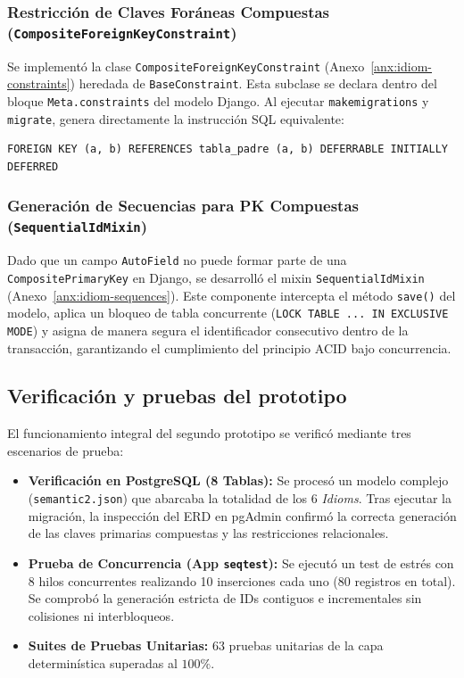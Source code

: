 \subsubsection{Restricción de Claves Foráneas Compuestas (\texttt{CompositeForeignKeyConstraint})}
Se implementó la clase \texttt{CompositeForeignKeyConstraint} (Anexo~\ref{anx:idiom-constraints}) heredada de \texttt{BaseConstraint}. Esta subclase se declara dentro del bloque \texttt{Meta.constraints} del modelo Django. Al ejecutar \texttt{makemigrations} y \texttt{migrate}, genera directamente la instrucción SQL equivalente:
\begin{verbatim}
FOREIGN KEY (a, b) REFERENCES tabla_padre (a, b) DEFERRABLE INITIALLY DEFERRED
\end{verbatim}

\subsubsection{Generación de Secuencias para PK Compuestas (\texttt{SequentialIdMixin})}
Dado que un campo \texttt{AutoField} no puede formar parte de una \texttt{CompositePrimaryKey} en Django, se desarrolló el mixin \texttt{SequentialIdMixin} (Anexo~\ref{anx:idiom-sequences}). Este componente intercepta el método \texttt{save()} del modelo, aplica un bloqueo de tabla concurrente (\texttt{LOCK TABLE ... IN EXCLUSIVE MODE}) y asigna de manera segura el identificador consecutivo dentro de la transacción, garantizando el cumplimiento del principio ACID bajo concurrencia.

\subsection{Verificación y pruebas del prototipo}
\label{subsec:p2-verificacion}

El funcionamiento integral del segundo prototipo se verificó mediante tres escenarios de prueba:

\begin{itemize}
    \item \textbf{Verificación en PostgreSQL (8 Tablas):} Se procesó un modelo complejo (\texttt{semantic2.json}) que abarcaba la totalidad de los 6 \textit{Idioms}. Tras ejecutar la migración, la inspección del ERD en pgAdmin confirmó la correcta generación de las claves primarias compuestas y las restricciones relacionales.
    \item \textbf{Prueba de Concurrencia (App \texttt{seqtest}):} Se ejecutó un test de estrés con 8 hilos concurrentes realizando 10 inserciones cada uno (80 registros en total). Se comprobó la generación estricta de IDs contiguos e incrementales sin colisiones ni interbloqueos.
    \item \textbf{Suites de Pruebas Unitarias:} 63 pruebas unitarias de la capa determinística superadas al $100\%$.
\end{itemize}